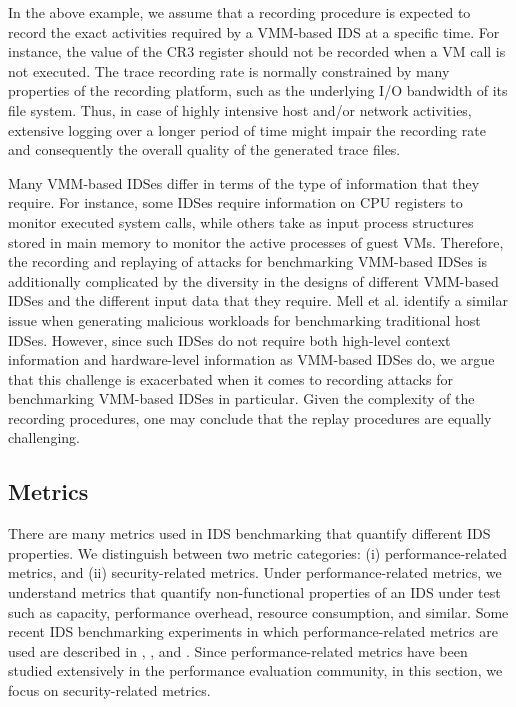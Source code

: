 In the above example, we assume that a recording procedure is expected to record the exact activities required by a VMM-based IDS at a specific time. For instance, the value of the CR3 register should not be recorded when a VM call is not executed. The trace recording rate is normally constrained by many properties of the recording platform, such as the underlying I/O bandwidth of its file system. Thus, in case of highly intensive host and/or network activities, extensive logging over a longer period of time might impair the recording rate and consequently the overall quality of the generated trace files. 

Many VMM-based IDSes differ in terms of the type of information that they require. For instance, some IDSes require information on CPU registers to monitor executed system calls, while others take as input process structures stored in main memory to monitor the active processes of guest VMs. Therefore, the recording and replaying of attacks for benchmarking VMM-based IDSes is additionally complicated by the diversity in the designs of different VMM-based IDSes and the different input data that they require. Mell et al. \cite{mell:anoverview} identify a similar issue when generating malicious workloads for benchmarking traditional host IDSes.  However, since such IDSes do not require both high-level context information and hardware-level information as VMM-based IDSes do, we argue that this challenge is exacerbated when it comes to recording attacks for benchmarking VMM-based IDSes in particular. Given the complexity of the recording procedures, one may conclude that the replay procedures are equally challenging. 

\subsection{Metrics}

There are many metrics used in IDS benchmarking that quantify different IDS properties. We distinguish between two metric categories: (i) performance-related metrics, and (ii) security-related metrics. Under performance-related metrics, we understand metrics that quantify non-functional properties of an IDS under test such as capacity, performance overhead, resource consumption, and similar. Some recent IDS benchmarking experiments in which performance-related metrics are used are described in \cite{meng:adaptive}, \cite{lombardi:secure}, and \cite{mohammed:mechanism}. Since performance-related metrics have been studied extensively in the performance evaluation community, in this section, we focus on security-related metrics.


